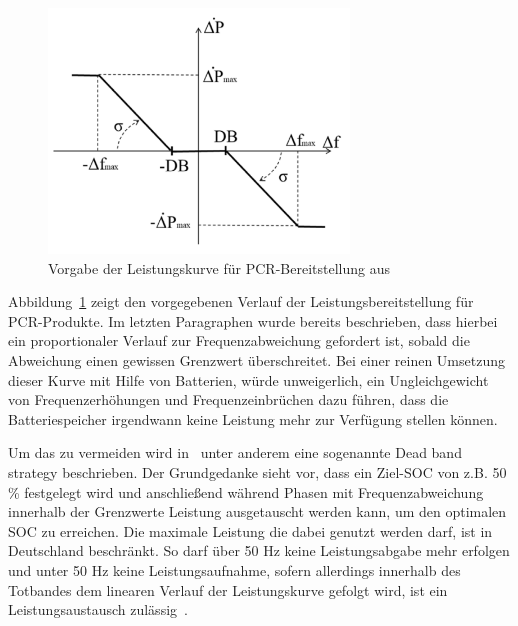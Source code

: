 \begin{figure}[h!]
    \centering
    \includegraphics[width=8cm]{Abbildungen/DroopControl.png}
    \caption{Vorgabe der Leistungskurve für PCR-Bereitstellung aus~\parencite[Kap. 3]{noauthor_soc_nodate}}\label{Droop}
\end{figure}

Abbildung~\ref{Droop} zeigt den vorgegebenen Verlauf der Leistungsbereitstellung für PCR-Produkte.
Im letzten Paragraphen wurde bereits beschrieben, dass hierbei ein proportionaler Verlauf zur Frequenzabweichung 
gefordert ist, sobald die Abweichung einen gewissen Grenzwert überschreitet.
Bei einer reinen Umsetzung dieser Kurve mit Hilfe von Batterien, würde unweigerlich, ein Ungleichgewicht von 
Frequenzerhöhungen und Frequenzeinbrüchen dazu führen, dass die Batteriespeicher irgendwann keine Leistung mehr
zur Verfügung stellen können.

Um das zu vermeiden wird in~\parencite[]{noauthor_soc_nodate} unter anderem eine sogenannte Dead band strategy beschrieben.
Der Grundgedanke sieht vor, dass ein Ziel-SOC von z.B. 50 \% festgelegt wird und anschließend während Phasen mit 
Frequenzabweichung innerhalb der Grenzwerte Leistung ausgetauscht werden kann, um den optimalen SOC zu erreichen.
Die maximale Leistung die dabei genutzt werden darf, ist in Deutschland beschränkt.
So darf über 50 Hz keine Leistungsabgabe mehr erfolgen und unter 50 Hz keine Leistungsaufnahme,
sofern allerdings innerhalb des Totbandes dem linearen Verlauf der Leistungskurve gefolgt wird,
ist ein Leistungsaustausch zulässig~\parencite[]{marchgraber_modellierung_2019}.

